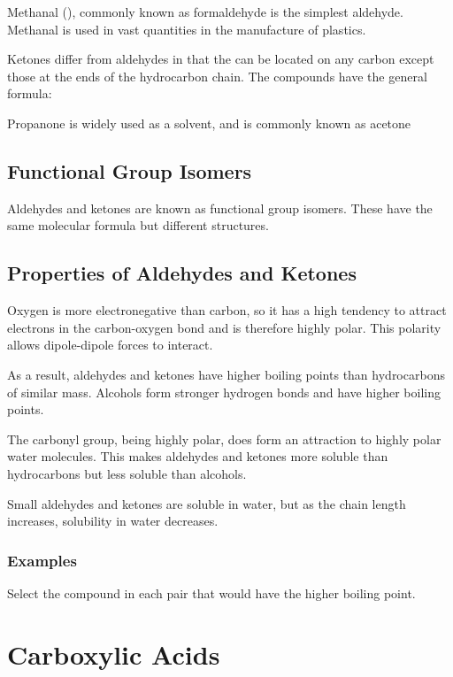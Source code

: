 	Methanal (), commonly known as formaldehyde is the simplest aldehyde. Methanal is used in vast quantities in the manufacture of plastics.

	Ketones differ from aldehydes in that the  can be located on any carbon except those at the ends of the hydrocarbon chain. The compounds have the general formula:

	\begin{center}
	\end{center}

	Propanone is widely used as a solvent, and is commonly known as acetone

	\subsection{Functional Group Isomers}
	
		Aldehydes and ketones are known as functional group isomers. These have the same molecular formula but different structures.

	\subsection{Properties of Aldehydes and Ketones}
	
		Oxygen is more electronegative than carbon, so it has a high tendency to attract electrons in the carbon-oxygen bond and is therefore highly polar. This polarity allows dipole-dipole forces to interact.

		As a result, aldehydes and ketones have higher boiling points than hydrocarbons of similar mass. Alcohols form stronger hydrogen bonds and have higher boiling points.

		The carbonyl group, being highly polar, does form an attraction to highly polar water molecules. This makes aldehydes and ketones more soluble than hydrocarbons but less soluble than alcohols.

		Small aldehydes and ketones are soluble in water, but as the chain length increases, solubility in water decreases.

		\subsubsection{Examples}
	
			Select the compound in each pair that would have the higher boiling point.

\section{Carboxylic Acids}

